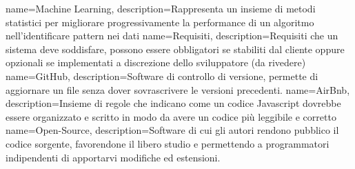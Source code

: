 {
    name=Machine Learning,
    description={Rappresenta un insieme di metodi statistici per migliorare progressivamente la performance di un algoritmo nell'identificare pattern nei dati}
}
{
    name=Requisiti,
    description={Requisiti che un sistema deve soddisfare, possono essere obbligatori se stabiliti dal cliente oppure opzionali se implementati a discrezione dello sviluppatore (da rivedere)}
}
{
    name=GitHub,
    description={Software di controllo di versione, permette di aggiornare un file senza dover sovrascrivere le versioni precedenti.}
}
{
    name=AirBnb,
    description={Insieme di regole che indicano come un codice Javascript dovrebbe essere organizzato e scritto in modo da avere un codice più leggibile e corretto}
}
{
    name=Open-Source,
    description={Software di cui gli autori rendono pubblico il codice sorgente, favorendone il libero studio e permettendo a programmatori indipendenti di apportarvi modifiche ed estensioni.}
}


